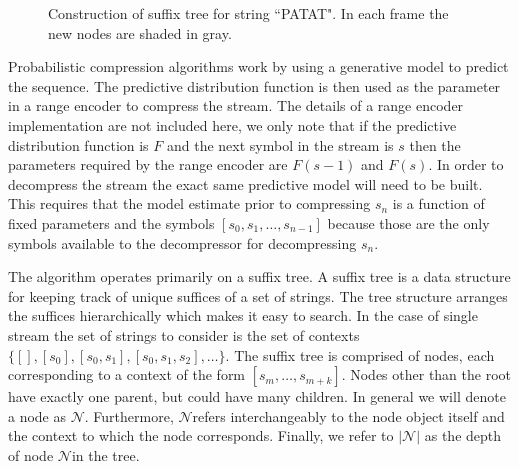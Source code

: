 \newcommand{\T}{\ensuremath{\mathcal{T}}}
\newcommand{\N}{\ensuremath{\mathcal{N}}}
\newcommand{\M}{\ensuremath{\mathcal{M}}}
\newcommand{\PP}{\ensuremath{\mathcal{P}}}
\newcommand{\nc}{\ensuremath{nc}}
\newcommand{\RS}{\ensuremath{\mathcal{R}\mathcal{S}}}
\newcommand{\D}{\ensuremath{\mathcal{D}}}

\begin{figure}[t] 
	\begin{center}
		\caption{Construction of suffix tree for string ``PATAT".  In each frame the new nodes are shaded in gray.}
		\label{fig:suffix_tree}
	\end{center} 
\end{figure} 

Probabilistic compression algorithms work by using a generative model to predict the sequence.  The predictive distribution function is then used as the parameter in a range encoder to compress the stream.  The details of a range encoder implementation are not included here, we only note that if the predictive distribution function is $F$ and the next symbol in the stream is $s$ then the parameters required by the range encoder are $F(s-1)$ and $F(s)$.  In order to decompress the stream the exact same predictive model will need to be built.  This requires that the model estimate prior to compressing $s_n$ is a function of fixed parameters and the symbols $[s_0, s_1, \ldots, s_{n-1}]$ because those are the only symbols available to the decompressor for decompressing $s_n$.  

The algorithm operates primarily on a suffix tree.  A suffix tree is a data structure for keeping track of unique suffices of a set of strings.  The tree structure arranges the suffices hierarchically which makes it easy to search.  In the case of single stream the set of strings to consider is the set of contexts $\{ [ ], [s_0], [s_0,s_1], [s_0, s_1,s_2], \ldots \}$.  The suffix tree is comprised of nodes, each corresponding to a context of the form $[s_m, \ldots, s_{m + k}]$.  Nodes other than the root have exactly one parent, but could have many children.  In general we will denote a node as \N.  Furthermore, \N \space refers interchangeably to the node object itself and the context to which the node corresponds.  Finally, we refer to $| \N |$ as the depth of node \N \space in the tree.

